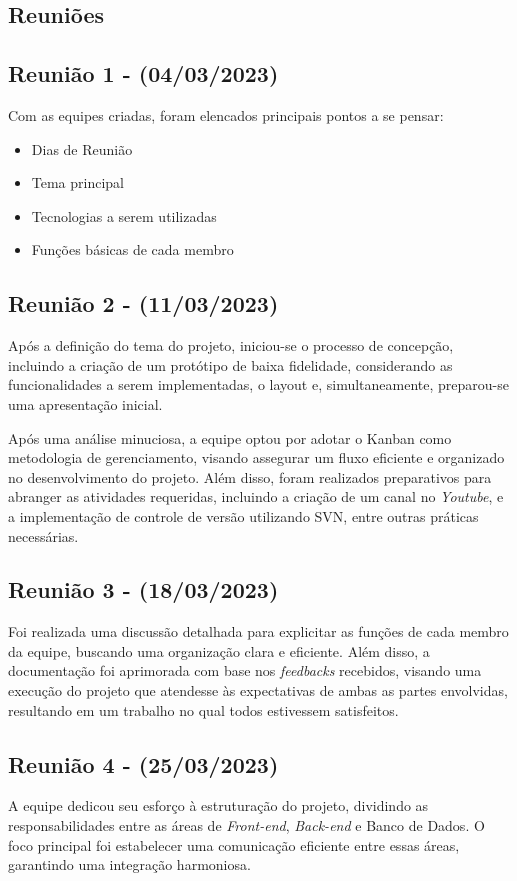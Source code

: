 \begin{apendicesenv}
\chapter{Reuniões}
\label{ata-reunião}

\section{Reunião 1 - (04/03/2023)}
Com as equipes criadas, foram elencados principais pontos a se pensar:

\begin{itemize}
    \item Dias de Reunião
    \item Tema principal
    \item Tecnologias a serem utilizadas
    \item Funções básicas de cada membro
\end{itemize}

\section{Reunião 2 - (11/03/2023)}
Após a definição do tema do projeto, iniciou-se o processo de concepção, incluindo a criação de um protótipo de baixa fidelidade, considerando as funcionalidades a serem implementadas, o layout e, simultaneamente, preparou-se uma apresentação inicial.

Após uma análise minuciosa, a equipe optou por adotar o Kanban como metodologia de gerenciamento, visando assegurar um fluxo eficiente e organizado no desenvolvimento do projeto. Além disso, foram realizados preparativos para abranger as atividades requeridas, incluindo a criação de um canal no \textit{\gls{Youtube}}, e a implementação de controle de versão utilizando SVN, entre outras práticas necessárias.

\section{Reunião 3 - (18/03/2023)}
Foi realizada uma discussão detalhada para explicitar as funções de cada membro da equipe, buscando uma organização clara e eficiente. Além disso, a documentação foi aprimorada com base nos \textit{feedbacks} recebidos, visando uma execução do projeto que atendesse às expectativas de ambas as partes envolvidas, resultando em um trabalho no qual todos estivessem satisfeitos.

\section{Reunião 4 - (25/03/2023)}
A equipe dedicou seu esforço à estruturação do projeto, dividindo as responsabilidades entre as áreas de \textit{\gls{Front-end}}, \textit{\gls{Back-end}} e Banco de Dados. O foco principal foi estabelecer uma comunicação eficiente entre essas áreas, garantindo uma integração harmoniosa. 


\end{apendicesenv}

